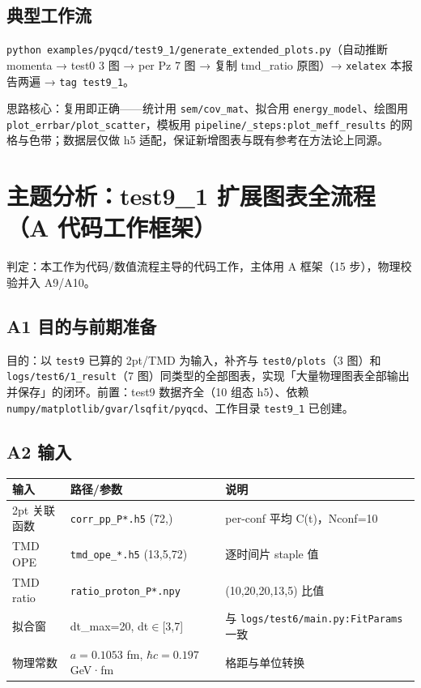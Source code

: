 \documentclass[UTF8]{ctexart}
\begin{document}
\subsection{典型工作流}
\texttt{python examples/pyqcd/test9\_1/generate\_extended\_plots.py}（自动推断 momenta → test0 3 图 → per Pz 7 图 → 复制 tmd\_ratio 原图）→ \texttt{xelatex} 本报告两遍 → \texttt{tag test9\_1}。

\begin{ideabox}
思路核心：复用即正确——统计用 \texttt{sem/cov\_mat}、拟合用 \texttt{energy\_model}、绘图用 \texttt{plot\_errbar/plot\_scatter}，模板用 \texttt{pipeline/\_steps:plot\_meff\_results} 的网格与色带；数据层仅做 h5 适配，保证新增图表与既有参考在方法论上同源。
\end{ideabox}

\section{主题分析：test9\_1 扩展图表全流程（A 代码工作框架）}
判定：本工作为代码/数值流程主导的代码工作，主体用 A 框架（15 步），物理校验并入 A9/A10。

\subsection{A1 目的与前期准备}
目的：以 \texttt{test9} 已算的 2pt/TMD 为输入，补齐与 \texttt{test0/plots}（3 图）和 \texttt{\nolinkurl{logs/test6/1\_result}}（7 图）同类型的全部图表，实现「大量物理图表全部输出并保存」的闭环。前置：test9 数据齐全（10 组态 h5）、依赖 \texttt{numpy/matplotlib/gvar/lsqfit/pyqcd}、工作目录 \texttt{test9\_1} 已创建。

\subsection{A2 输入}
\begin{xltabular}{\textwidth}{lXX}
\toprule
输入 & 路径/参数 & 说明 \\
\midrule
\endhead
2pt 关联函数 & \texttt{\nolinkurl{corr\_pp\_P*.h5}} (72,) & per-conf 平均 C(t)，Nconf=10 \\
TMD OPE & \texttt{\nolinkurl{tmd\_ope\_*.h5}} (13,5,72) & 逐时间片 staple 值 \\
TMD ratio & \texttt{\nolinkurl{ratio\_proton\_P*.npy}} & (10,20,20,13,5) 比值 \\
拟合窗 & dt\_max=20, dt$\in$[3,7] & 与 \texttt{\nolinkurl{logs/test6/main.py:FitParams}} 一致 \\
物理常数 & $a=0.1053$ fm, $\hbar c=0.197$ GeV·fm & 格距与单位转换 \\
\bottomrule
\end{xltabular}
\end{document}

